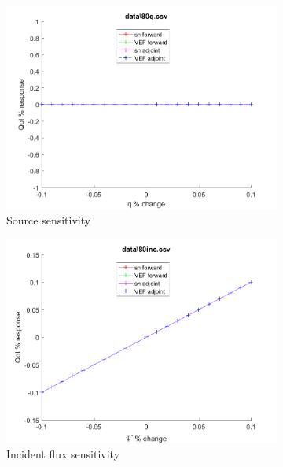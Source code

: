 \documentclass{article}
\begin{document}
\begin{figure}[H]
\label{Case80Sens}
\centering
\begin{subfigure}{.5\textwidth}
  \centering
  \includegraphics[width=.98\linewidth]{IanProposal/figures2/80qSens.png}
  \caption{Source sensitivity}
  \label{fig:sfig1}
\end{subfigure}%
\begin{subfigure}{.5\textwidth}
  \centering
  \includegraphics[width=.98\linewidth]{IanProposal/figures2/80incSens.png}
  \caption{Incident flux sensitivity}
  \label{fig:sfig4}
\end{subfigure}%
\\
\begin{subfigure}{.5\textwidth}
  \centering

\end{subfigure}
\end{figure}
\end{document}
